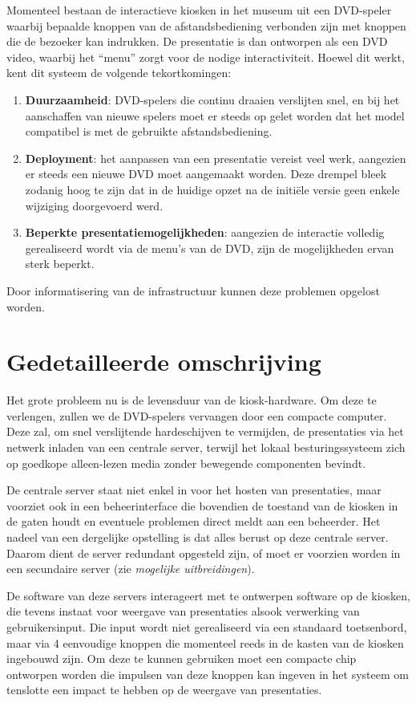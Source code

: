 \documentclass[a4paper,oneside,11pt,final]{memoir}
\begin{document}
Momenteel bestaan de interactieve kiosken in het museum uit een DVD-speler waarbij bepaalde knoppen van de afstandsbediening verbonden zijn met knoppen die de bezoeker kan indrukken. De presentatie is dan ontworpen als een DVD video, waarbij het ``menu'' zorgt voor de nodige interactiviteit. Hoewel dit werkt, kent dit systeem de volgende tekortkomingen:
\begin{enumerate}
\item \textbf{Duurzaamheid}: DVD-spelers die continu draaien verslijten snel, en bij het aanschaffen van nieuwe spelers moet er steeds op gelet worden dat het model compatibel is met de gebruikte afstandsbediening.
\item \textbf{Deployment}: het aanpassen van een presentatie vereist veel werk, aangezien er steeds een nieuwe DVD moet aangemaakt worden. Deze drempel bleek zodanig hoog te zijn dat in de huidige opzet na de initiële versie geen enkele wijziging doorgevoerd werd.
\item \textbf{Beperkte presentatiemogelijkheden}: aangezien de interactie volledig gerealiseerd wordt via de menu's van de DVD, zijn de mogelijkheden ervan sterk beperkt.
\end{enumerate}

Door informatisering van de infrastructuur kunnen deze problemen opgelost worden.

\section{Gedetailleerde omschrijving}

Het grote probleem nu is de levensduur van de kiosk-hardware. Om deze te verlengen, zullen we de DVD-spelers vervangen door een compacte computer. Deze zal, om snel verslijtende hardeschijven te vermijden, de presentaties via het netwerk inladen van een centrale server, terwijl het lokaal besturingssysteem zich op goedkope alleen-lezen media zonder bewegende componenten bevindt.

De centrale server staat niet enkel in voor het hosten van presentaties, maar voorziet ook in een beheerinterface die bovendien de toestand van de kiosken in de gaten houdt en eventuele problemen direct meldt aan een beheerder. Het nadeel van een dergelijke opstelling is dat alles berust op deze centrale server. Daarom dient de server redundant opgesteld zijn, of moet er voorzien worden in een secundaire server (zie \emph{mogelijke uitbreidingen}).

De software van deze servers interageert met te ontwerpen software op de kiosken, die tevens instaat voor weergave van presentaties alsook verwerking van gebruikersinput. Die input wordt niet gerealiseerd via een standaard toetsenbord, maar via 4 eenvoudige knoppen die momenteel reeds in de kasten van de kiosken ingebouwd zijn. Om deze te kunnen gebruiken moet een compacte chip ontworpen worden die impulsen van deze knoppen kan ingeven in het systeem om tenslotte een impact te hebben op de weergave van presentaties.
\end{document}
